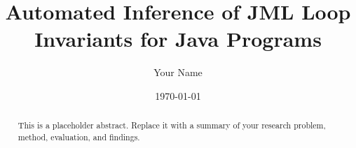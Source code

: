 \documentclass[12pt,a4paper,oneside]{report}
\title{Automated Inference of JML Loop Invariants for Java Programs}
\author{Your Name}
\date{\today}
\begin{document}
\hypersetup{pageanchor=false}
\maketitle
\begin{abstract}
  This is a placeholder abstract. Replace it with a summary of your
  research problem, method, evaluation, and findings.
\end{abstract}

\hypersetup{pageanchor=true}
\tableofcontents
\clearpage
{}









\printbibliography[heading=bibintoc]
\end{document}

